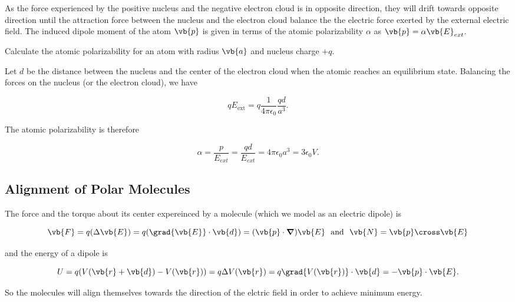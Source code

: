 \documentclass[english,a4paper,12pt]{report}
\begin{document}
As the force experienced by the positive nucleus and the negative electron cloud is in opposite direction, they will drift towards opposite direction until the attraction force between the nucleus and the electron cloud balance the the electric force exerted by the external electric field. The induced dipole moment of the atom \(\vb{p} \) is given in terms of the atomic polarizability \(\alpha \) as \(\vb{p} = \alpha \vb{E}_{ext}  \).

{Calculate the atomic polarizability for an atom with radius \(\vb{a} \) and nucleus charge \(+q\).}
{Let \(d\) be the distance between the nucleus and the center of the electron cloud when the atomic reaches an equilibrium state. Balancing the forces on the nucleus (or the electron cloud), we have

\begin{equation}
    qE_{\text{ext} }  = q \frac{1}{4\pi \epsilon_0} \frac{qd}{a^3 }.
\end{equation}

The atomic polarizability is therefore 

\begin{equation}
    \alpha = \frac{p}{E_{ext} } =  \frac{qd}{E_{ext} } = 4\pi \epsilon _0 a^3 = 3\epsilon _0 V. 
\end{equation}
} 

\subsection{Alignment of Polar Molecules} \label{alignpolar} 

The force and the torque about its center expereinced by a molecule (which we model as an electric dipole) is 

\begin{equation}
    \vb{F} = q(\Delta \vb{E} ) = q (\grad{\vb{E} } \cdot \vb{d}) = (\vb{p}  \cdot \boldsymbol{\nabla }) \vb{E} ~\text { and }~ \vb{N} = \vb{p} \cross \vb{E}
\end{equation}

and the energy of a dipole is 

\begin{equation}
    U = q(V(\vb{r} + \vb{d} ) - V(\vb{r} )) = q\Delta V(\vb{r} ) = q\grad{V(\vb{r} )}\cdot \vb{d} = - \vb{p} \cdot \vb{E}. 
\end{equation}

So the molecules will align themselves towards the direction of the elctric field in order to achieve minimum energy. 
\end{document}
